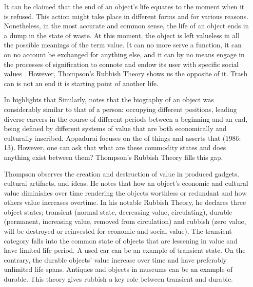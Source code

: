 It can be claimed that the end of an object’s life equates to the moment when it is refused. This action might take place in different forms and for various reasons. Nonetheless, in the most accurate and common sense, the life of an object ends in a dump in the state of waste. At this moment, the object is left valueless in all the possible meanings of the term value. It can no more serve a function, it can on no account be exchanged for anything else, and it can by no means engage in the processes of signification to connote and endow its user with specific social values \citep[63]{emgin2012trashion}. However, Thompson’s Rubbish Theory shows us the opposite of it. Trash can is not an end it is starting point of another life.

In  \cite[3]{appadurai1988social} highlights that  Similarly, \cite{kopytoff1986cultural} notes that the biography of an object was considerably similar to that of a person: occupying different positions, leading diverse careers in the course of different periods between a beginning and an end, being defined by different systems of value that are both economically and culturally inscribed. Appadurai focuses on the  of things and asserts that  (1986: 13). However, one can ask that what are these commodity states and does anything exist between them? Thompson’s Rubbish Theory fills this gap.

Thompson observes the creation and destruction of value in produced gadgets, cultural artifacts, and ideas. He notes that how an object’s economic and cultural value diminishes over time rendering the objects worthless or redundant and how others value increases overtime. In his notable Rubbish Theory, he declares three object states; transient (normal state, decreasing value, circulating), durable (permanent, increasing value, removed from circulation) and rubbish (zero value, will be destroyed or reinvested for economic and social value). The transient category falls into the common state of objects that are lessening in value and have limited life period. A used car can be an example of transient state. On the contrary, the durable objects’ value increase over time and have preferably unlimited life spans. Antiques and objects in museums can be an example of durable. This theory gives rubbish a key role between transient and durable.

